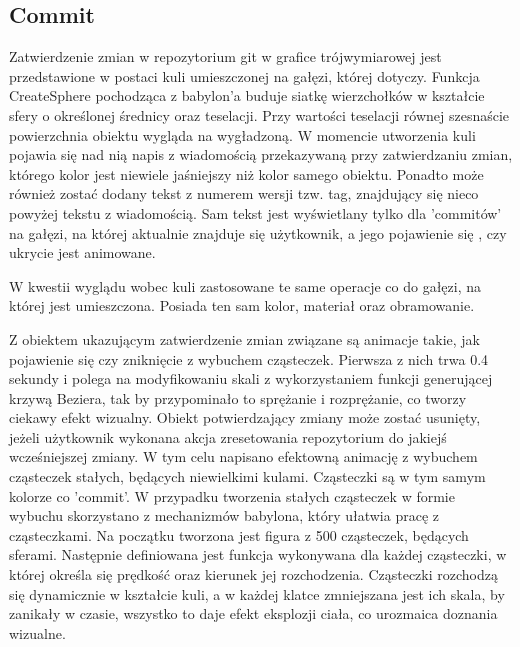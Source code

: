 \documentclass[11pt,a4paper,polish,thesis]{dcsbook}
\begin{document}
	\subsection{Commit}
	Zatwierdzenie zmian w repozytorium git w grafice trójwymiarowej jest przedstawione w postaci kuli umieszczonej na gałęzi, której dotyczy. Funkcja CreateSphere pochodząca z babylon'a buduje siatkę wierzchołków w kształcie sfery o określonej średnicy oraz teselacji. Przy wartości teselacji równej szesnaście powierzchnia obiektu wygląda na wygładzoną. W momencie utworzenia kuli  pojawia się nad nią napis z wiadomością przekazywaną przy zatwierdzaniu zmian, którego kolor jest niewiele jaśniejszy niż kolor samego obiektu. Ponadto może również zostać dodany tekst z numerem wersji tzw. tag, znajdujący się nieco powyżej tekstu z wiadomością. Sam tekst jest wyświetlany tylko dla 'commitów' na gałęzi, na której aktualnie znajduje się użytkownik, a jego pojawienie się , czy ukrycie jest animowane. 

 W kwestii wyglądu wobec kuli zastosowane te same operacje co do gałęzi, na której jest umieszczona. Posiada ten sam kolor, materiał oraz obramowanie. 
 
Z obiektem ukazującym zatwierdzenie zmian związane są animacje takie, jak pojawienie się czy zniknięcie z wybuchem cząsteczek. Pierwsza z nich trwa 0.4 sekundy i polega na modyfikowaniu skali z wykorzystaniem funkcji generującej krzywą Beziera, tak by przypominało to sprężanie i rozprężanie, co tworzy ciekawy efekt wizualny. Obiekt potwierdzający zmiany może zostać usunięty, jeżeli użytkownik wykonana akcja zresetowania repozytorium do jakiejś wcześniejszej zmiany. W tym celu napisano efektowną animację z wybuchem cząsteczek stałych, będących niewielkimi kulami. Cząsteczki są w tym samym kolorze co 'commit'. W przypadku tworzenia stałych cząsteczek w formie wybuchu skorzystano z mechanizmów babylona, który ułatwia pracę z cząsteczkami. Na początku tworzona jest figura z 500 cząsteczek, będących sferami. Następnie definiowana jest funkcja wykonywana dla każdej cząsteczki, w której określa się prędkość oraz kierunek jej rozchodzenia. Cząsteczki rozchodzą się dynamicznie w kształcie kuli, a w każdej klatce zmniejszana jest ich skala, by zanikały w czasie, wszystko to daje efekt eksplozji ciała, co urozmaica doznania wizualne. 
 
   

	
	
\end{document}
